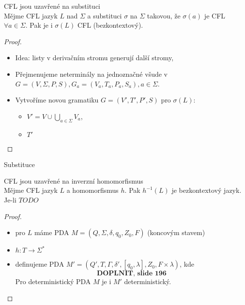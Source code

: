 \documentclass[../main.tex]{subfiles}
\begin{document}
\begin{theorem}
    CFL jsou uzavřené na substituci\\

    Mějme CFL jazyk $L$ nad $\Sigma$ a substituci $\sigma$ na $\Sigma$ takovou, že $\sigma(a)$ je CFL $\forall a\in \Sigma$. Pak je 
    i $\sigma(L)$ CFL (bezkontextový).
    \begin{proof}
        \begin{itemize}
            \item Idea: listy v derivačním stromu generují další stromy,
            \item Přejmenujeme neterminály na jednoznačné všude v $G = (V,\Sigma, P,S), G_a = (V_a,T_a,P_a,S_a), a \in \Sigma$.
            \item Vytvoříme novou gramatiku $G = (V',T',P',S)$ pro $\sigma(L)$:
            \begin{itemize}
                \item $V' = V \cup \bigcup_{a\in \Sigma}V_a$,
                \item $T'$
            \end{itemize}
        \end{itemize}
    \end{proof}
\end{theorem}
\begin{example}
    Substituce\\

    
\end{example}
\begin{theorem}
    CFL jsou uzavřené na inverzní homomorfismus\\

    Mějme CFL jazyk $L$ a homomorfismus $h$. Pak $h^{-1}(L)$ je bezkontextový jazyk.
    Je-li $TO DO$
    \begin{proof}
        \begin{itemize}
            \item pro $L$ máme PDA $M = (Q,\Sigma,\delta,q_0,Z_0,F)$ (koncovým stavem)
            \item $h : T \rightarrow \Sigma^*$
            \item definujeme PDA $M' = (Q',T,\Gamma,\delta', [q_0,\lambda],Z_0,F\times {\lambda})$, kde
            \[\textbf{DOPLNIT, slide 196}\]
            Pro deterministický PDA $M$ je i $M'$ deterministický.
        \end{itemize}
    \end{proof}
\end{theorem}
\end{document}

